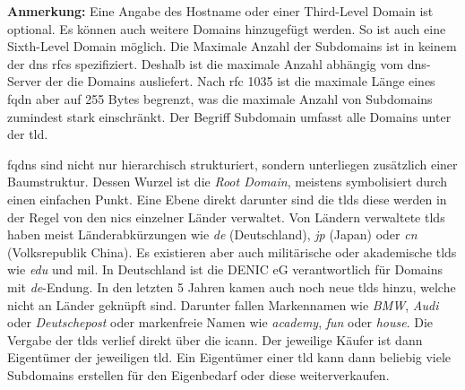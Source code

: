 \documentclass[titlepage]{report}
\begin{document}
\textbf{Anmerkung:} Eine Angabe des Hostname oder einer Third-Level
Domain ist optional. Es können auch weitere Domains hinzugefügt werden.
So ist auch eine Sixth-Level Domain möglich. Die Maximale Anzahl der
Subdomains ist in keinem der \gls{dns} \glspl{rfc} spezifiziert. Deshalb
ist die maximale Anzahl abhängig vom \gls{dns}\hyp{}Server der die
Domains ausliefert. Nach \gls{rfc} 1035 ist die maximale Länge eines
\gls{fqdn} aber auf 255 Bytes begrenzt\cite[siehe Section
2.3.4]{RFC1035}, was die maximale Anzahl von Subdomains zumindest stark
einschränkt. Der Begriff Subdomain umfasst alle Domains unter der
\gls{tld}.

\glspl{fqdn} sind nicht nur hierarchisch strukturiert, sondern
unterliegen zusätzlich einer Baumstruktur. Dessen Wurzel ist die
\emph{Root Domain}, meistens symbolisiert durch einen einfachen Punkt.
Eine Ebene direkt darunter sind die \glspl{tld} diese
werden in der Regel von den \glspl{nic} einzelner Länder verwaltet. Von
Ländern verwaltete \glspl{tld} haben meist Länderabkürzungen wie
\emph{de} (Deutschland), \emph{jp} (Japan) oder \emph{cn} (Volksrepublik
China). Es existieren aber auch militärische oder akademische
\glspl{tld} wie \emph{edu} und {mil}. In Deutschland ist die DENIC eG
verantwortlich für Domains mit \emph{de}\hyp{}Endung.
In den letzten 5 Jahren kamen auch noch neue \glspl{tld} hinzu, welche
nicht an Länder geknüpft sind. Darunter fallen Markennamen wie
\emph{BMW}, \emph{Audi} oder \emph{Deutschepost} oder markenfreie Namen
wie \emph{academy}, \emph{fun} oder \emph{house}\cite{NEWTLDLIST}. Die
Vergabe der \glspl{tld} verlief direkt über die \gls{icann}. Der jeweilige
Käufer ist dann Eigentümer der jeweiligen \gls{tld}. Ein Eigentümer
einer \gls{tld} kann dann beliebig viele Subdomains erstellen für den
Eigenbedarf oder diese weiterverkaufen.
\section*{}
\section*{}
\section*{}
\section*{}
\end{document}
